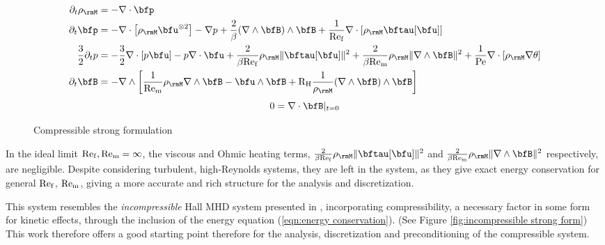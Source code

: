     \begin{figure}
        \centering
        \line
        \begin{align}
            \partial_{t}\rho_{\rmM}  &=  - \nabla\cdot\bfp  \\
            \partial_{t}\bfp  &=  -  \nabla\cdot\left[\rho_{\rmM}\bfu^{\otimes 2}\right] - \nabla p + \frac{2}{\beta}(\nabla\wedge\bfB)\wedge\bfB + \frac{1}{\rmRef}\nabla\cdot[\rho_{\rmM}\bftau[\bfu]]  \\
            \frac{3}{2}\partial_{t}p  &=  - \frac{3}{2}\nabla\cdot[p\bfu] - p\nabla\cdot\bfu + \frac{2}{\beta\rmRef}\rho_{\rmM}\|\bftau[\bfu]\|^{2} + \frac{2}{\beta\rmRem}\rho_{\rmM}\|\nabla\wedge\bfB\|^{2} + \frac{1}{\rmPe}\nabla\cdot[\rho_{\rmM}\nabla\theta]  \label{eqn:energy conservation}  \\
            \partial_{t}\bfB  &=  - \nabla\wedge\left[\frac{1}{\rmRem}\rho_{\rmM}\nabla\wedge\bfB - \bfu\wedge\bfB + \rmRH\frac{1}{\rho_{\rmM}}(\nabla\wedge\bfB)\wedge\bfB\right]
        \end{align}
        \shortline
        \begin{equation}
            0  =  \nabla\cdot\bfB|_{t = 0}
        \end{equation}
        \line
        \caption{Compressible strong formulation}
        \label{fig:compressible strong form}
    \end{figure}

    In the ideal limit $\mathrm{Re}_{\mathrm{f}}, \mathrm{Re}_{\mathrm{m}}  =  \infty$, the viscous and Ohmic heating terms, $\frac{2}{\beta\rmRef}\rho_{\rmM}\|\bftau[\bfu]\|^{2}$ and $\frac{2}{\beta\rmRem}\rho_{\rmM}\|\nabla\wedge\bfB\|^{2}$ respectively, are negligible. Despite considering turbulent, high-Reynolds systems, they are left in the system, as they give exact energy conservation for general $\mathrm{Re}_{\mathrm{f}}$, $\mathrm{Re}_{\mathrm{m}}$, giving a more accurate and rich structure for the analysis and discretization.

    This system resembles the \emph{incompressible} Hall MHD system presented in \cite{LHF22}, incorporating compressibility, a necessary factor in some form for kinetic effects, through the inclusion of the energy equation (\ref{eqn:energy conservation}). (See Figure \ref{fig:incompressible strong form}) This work therefore offers a good starting point therefore for the analysis, discretization and preconditioning of the compressible system.


